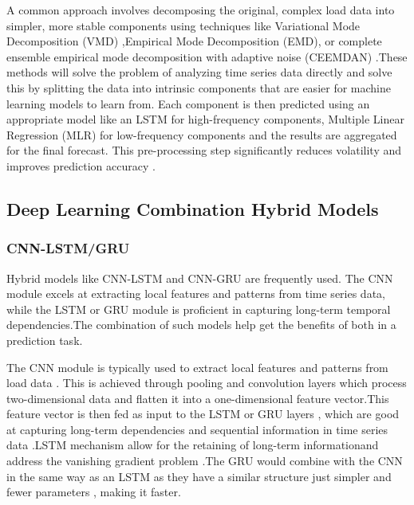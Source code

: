 A common approach involves decomposing the original, complex load data into simpler, more stable components using techniques like Variational Mode Decomposition (VMD) \cite{he2019hybrid},Empirical Mode Decomposition (EMD), or complete ensemble empirical mode decomposition with adaptive noise (CEEMDAN) \cite{hiceemdanQteg}.These methods will solve the problem of analyzing time series data directly and solve this by splitting the data into intrinsic components that are easier for machine learning models to learn from. Each component is then predicted using an appropriate model like an LSTM for high-frequency components, Multiple Linear Regression (MLR) for low-frequency components \cite{huang2023two} and the results are aggregated for the final forecast. This pre-processing step significantly reduces volatility and improves prediction accuracy \cite{wang2023short}.

\subsection{Deep Learning Combination Hybrid Models}
  
 \subsubsection{CNN-LSTM/GRU}
 
  Hybrid models like CNN-LSTM and CNN-GRU are frequently used. The CNN module excels at extracting local features and patterns from time series data, while the LSTM or GRU module is proficient in capturing long-term temporal dependencies\cite{zhu2025novel}.The combination of such models help get the benefits of both in a prediction task.
  
  The CNN module is typically used to extract local features and patterns from load data \cite{wu2020short} . This is achieved through pooling and convolution layers which process two-dimensional data and flatten it into a one-dimensional feature vector.This feature vector is then fed as input to the LSTM or GRU layers  , which are good at capturing long-term dependencies and sequential information in time series data \cite{zhu2025novel}.LSTM mechanism allow for the retaining of long-term informationand address the vanishing gradient problem \cite{zhu2025novel}.The GRU would combine with the CNN in the same way as an LSTM as they have a similar structure just simpler and fewer parameters , making it faster\cite{wang2018short}.
  

